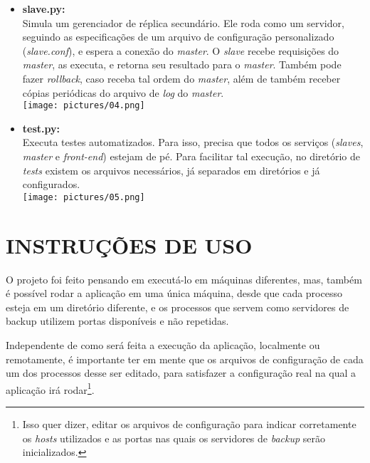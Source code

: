 \documentclass[12pt,a4paper]{article}
\begin{document}
\begin{itemize}
			\item \textbf{slave.py:}\\Simula um gerenciador de réplica secundário. Ele roda como um servidor, seguindo as especificações de um arquivo de configuração personalizado (\textit{slave.conf}), e espera a conexão do \textit{master}. O \textit{slave} recebe requisições do \textit{master}, as executa, e retorna seu resultado para o \textit{master}. Também pode fazer \textit{rollback}, caso receba tal ordem do \textit{master}, além de também receber cópias periódicas do arquivo de \textit{log} do \textit{master}.\\
				\texttt{[image: pictures/04.png]}
			
			\item \textbf{test.py:}\\Executa testes automatizados. Para isso, precisa que todos os serviços (\textit{slaves}, \textit{master} e \textit{front-end}) estejam de pé. Para facilitar tal execução, no diretório de \textit{tests} existem os arquivos necessários, já separados em diretórios e já configurados.\\
			\texttt{[image: pictures/05.png]}
		\end{itemize}
	
	\section{\normalsize INSTRUÇÕES DE USO}
		O projeto foi feito pensando em executá-lo em máquinas diferentes, mas, também é possível rodar a aplicação em uma única máquina, desde que cada processo esteja em um diretório diferente, e os processos que servem como servidores de backup utilizem portas disponíveis e não repetidas.
		
		Independente de como será feita a execução da aplicação, localmente ou remotamente, é importante ter em mente que os arquivos de configuração de cada um dos processos desse ser editado, para satisfazer a configuração real na qual a aplicação irá rodar\footnote{Isso quer dizer, editar os arquivos de configuração para indicar corretamente os \textit{hosts} utilizados e as portas nas quais os servidores de \textit{backup} serão inicializados.}.
	
\end{document}

